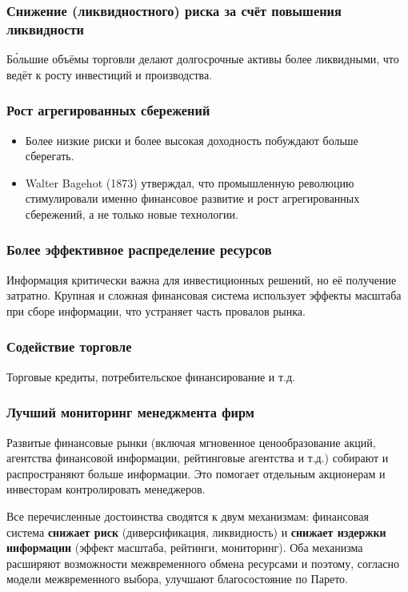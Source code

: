 \documentclass[10pt,a4paper]{article}
\begin{document}
\subsubsection{Снижение (ликвидностного) риска за счёт повышения ликвидности}
Бо́льшие объёмы торговли делают долгосрочные активы более ликвидными, что ведёт к росту инвестиций и производства.

\subsubsection{Рост агрегированных сбережений}
\begin{itemize}[leftmargin=1.3em]
\item Более низкие риски и более высокая доходность побуждают больше сберегать.
\item Walter Bagehot (1873) утверждал, что промышленную революцию стимулировали именно финансовое развитие и рост агрегированных сбережений, а не только новые технологии.
\end{itemize}

\subsubsection{Более эффективное распределение ресурсов}
Информация критически важна для инвестиционных решений, но её получение затратно. Крупная и сложная финансовая система использует эффекты масштаба при сборе информации, что устраняет часть провалов рынка.

\subsubsection{Содействие торговле}
Торговые кредиты, потребительское финансирование и т.д.

\subsubsection{Лучший мониторинг менеджмента фирм}
Развитые финансовые рынки (включая мгновенное ценообразование акций, агентства финансовой информации, рейтинговые агентства и т.д.) собирают и распространяют больше информации. Это помогает отдельным акционерам и инвесторам контролировать менеджеров.

\begin{intuition}
Все перечисленные достоинства сводятся к двум механизмам: финансовая система \textbf{снижает риск} (диверсификация, ликвидность) и \textbf{снижает издержки информации} (эффект масштаба, рейтинги, мониторинг). Оба механизма расширяют возможности межвременного обмена ресурсами и поэтому, согласно модели межвременного выбора, улучшают благосостояние по Парето.
\end{intuition}
\end{document}
